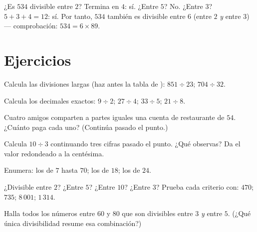 \begin{example}\label{ex:g5:division:criteria}
¿Es $534$ divisible entre $2$? Termina en $4$: sí. ¿Entre $5$? No. ¿Entre $3$?
$5 + 3 + 4 = 12$: sí. Por tanto, $534$ también es divisible entre $6$ (entre $2$
\emph{y} entre $3$) --- comprobación: $534 = 6 \times 89$.
\end{example}

\section{Ejercicios}

\begin{exercise}[$\star$]\label{exo:g5:division:1}
Calcula las divisiones largas (haz antes la tabla de ):
$851 \div 23$; \quad $704 \div 32$.
\end{exercise}

\begin{exercise}[$\star$]\label{exo:g5:division:2}
Calcula los  decimales exactos: $9 \div 2$; \quad $27 \div 4$;
\quad $33 \div 5$; \quad $21 \div 8$.
\end{exercise}

\begin{exercise}[$\star$]\label{exo:g5:division:3}
Cuatro amigos comparten a partes iguales una cuenta de restaurante de $54$. ¿Cuánto paga
cada uno? (Continúa pasado el punto.)
\end{exercise}

\begin{exercise}[$\star$]\label{exo:g5:division:4}
Calcula $10 \div 3$ continuando tres cifras pasado el punto. ¿Qué
observas? Da el valor redondeado a la centésima.
\end{exercise}

\begin{exercise}[$\star$]\label{exo:g5:division:5}
Enumera: los  de $7$ hasta $70$; los  de $18$; los
 de $24$.
\end{exercise}

\begin{exercise}[$\star$]\label{exo:g5:division:6}
¿Divisible entre $2$? ¿Entre $5$? ¿Entre $10$? ¿Entre $3$? Prueba cada criterio con:
$470$; \quad $735$; \quad $8\,001$; \quad $1\,314$.
\end{exercise}

\begin{exercise}[$\star$]\label{exo:g5:division:7}
Halla todos los números entre $60$ y $80$ que son divisibles entre
$3$ \emph{y} entre $5$. (¿Qué única divisibilidad resume esa
combinación?)
\end{exercise}


